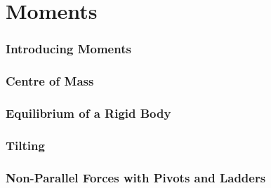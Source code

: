 \documentclass[../maths.tex]{subfiles}
\begin{document}
\chapter{Moments}
\subsection*{Introducing Moments}
\subsection*{Centre of Mass}
\subsection*{Equilibrium of a Rigid Body}
\subsection*{Tilting}
\subsection*{Non-Parallel Forces with Pivots and Ladders}
\end{document}
